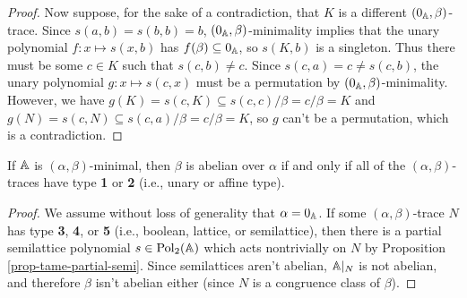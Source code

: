 \begin{appendices}
\begin{proof}
Now suppose, for the sake of a contradiction, that $K$ is a different $(0_{\mathbb{A}},\beta)$-trace. Since $s(a,b) = s(b,b) = b$, $(0_{\mathbb{A}},\beta)$-minimality implies that the unary polynomial $f : x \mapsto s(x,b)$ has $f(\beta) \subseteq 0_{\mathbb{A}}$, so $s(K,b)$ is a singleton. Thus there must be some $c \in K$ such that $s(c,b) \ne c$. Since $s(c,a) = c \ne s(c,b)$, the unary polynomial $g : x \mapsto s(c,x)$ must be a permutation by $(0_{\mathbb{A}},\beta)$-minimality. However, we have $g(K) = s(c,K) \subseteq s(c,c)/\beta = c/\beta = K$ and $g(N) = s(c,N) \subseteq s(c,a)/\beta = c/\beta = K$, so $g$ can't be a permutation, which is a contradiction.
\end{proof}

\begin{prop}\label{prop-abelian-minimal-set} If $\mathbb{A}$ is $(\alpha,\beta)$-minimal, then $\beta$ is abelian over $\alpha$ if and only if all of the $(\alpha,\beta)$-traces have type \textbf{1} or \textbf{2} (i.e., unary or affine type).
\end{prop}
\begin{proof} We assume without loss of generality that $\alpha = 0_{\mathbb{A}}$. If some $(\alpha,\beta)$-trace $N$ has type \textbf{3}, \textbf{4}, or \textbf{5} (i.e., boolean, lattice, or semilattice), then there is a partial semilattice polynomial $s \in \operatorname{Pol}_2(\mathbb{A})$ which acts nontrivially on $N$ by Proposition \ref{prop-tame-partial-semi}. Since semilattices aren't abelian, $\mathbb{A}|_N$ is not abelian, and therefore $\beta$ isn't abelian either (since $N$ is a congruence class of $\beta$).


\end{proof}
\end{appendices}
